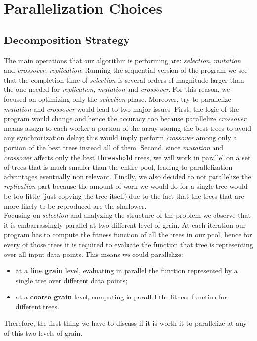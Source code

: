 \documentclass[10pt]{article}
\numberwithin{equation}{section}
\begin{document}
\section{Parallelization Choices}
\subsection{Decomposition Strategy}
The main operations that our algorithm is performing are: \emph{selection}, \emph{mutation} and \emph{crossover}, \emph{replication}. Running the sequential version of the program we see that the completion time of \emph{selection} is several orders of magnitude larger than the one needed for \emph{replication}, \emph{mutation} and \emph{crossover}. For this reason, we focused on optimizing only the \emph{selection} phase. Moreover, try to parallelize \emph{mutation} and \emph{crossover} would lead to two major issues. First, the logic of the program would change and hence the accuracy too because parallelize \emph{crossover} means assign to each worker a portion of the array storing the best trees to avoid any synchronization delay; this would imply perform \emph{crossover} among only a portion of the best trees instead all of them. Second, since \emph{mutation} and \emph{crossover} affects only the best \verb|threashold| trees, we will work in parallel on a set of trees that is much smaller than the entire pool, leading to parallelization advantages eventually non relevant. Finally, we also decided to not parallelize the \emph{replication} part because the amount of work we would do for a single tree would be too little (just copying the tree itself) due to the fact that the trees that are more likely to be reproduced are the shallower.\\
Focusing on \emph{selection} and analyzing the structure of the problem we observe that it is embarrassingly parallel at two different level of grain. At each iteration our program has to compute the fitness function of all the trees in our pool, hence for every of those trees it is required to evaluate the function that tree is representing over all input data points. This means we could parallelize:
\begin{itemize}
	\item at a \textbf{fine grain} level, evaluating in parallel the function represented by a single tree over different data points;
	\item at a \textbf{coarse grain} level, computing in parallel the fitness function for different trees.
\end{itemize}
Therefore, the first thing we have to discuss if it is worth it to parallelize at any of this two levels of grain.
\end{document}
